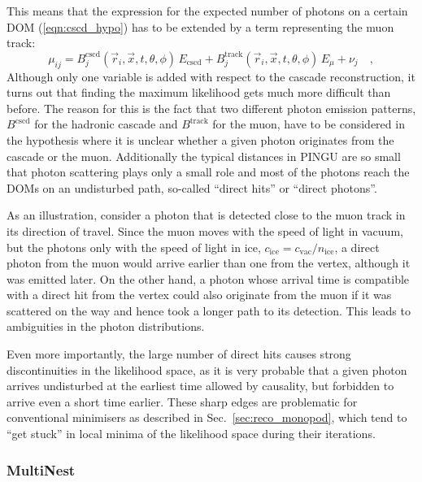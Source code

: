 This means that the expression for the expected number of photons on a certain
DOM (\ref{eqn:cscd_hypo}) has to be extended by a term representing the muon
track:
\begin{equation}
  \mu_{ij} = B^\mathrm{cscd}_j(\vec{r}_i, \vec{x}, t, \theta,\phi)
              \,E_\mathrm{cscd}
   + B^\mathrm{track}_j(\vec{r}_i, \vec{x}, t, \theta, \phi)\,E_\mu
   + \nu_j \quad, \label{eqn:hybrid_hypo}
\end{equation}
Although only one variable is added with respect to the cascade reconstruction,
it turns out that finding the maximum likelihood gets much more difficult than
before. The reason for this is the fact that two different photon emission
patterns, $B^\mathrm{cscd}$ for the hadronic cascade and $B^\mathrm{track}$ for
the muon, have to be considered in the hypothesis where it is unclear whether a
given photon originates from the cascade or the muon. Additionally the typical
distances in PINGU are so small that photon scattering plays only a small role
and most of the photons reach the DOMs on an undisturbed path, so-called
``direct hits'' or ``direct photons''.

As an illustration, consider a photon that is detected close to the muon track
in its direction of travel. Since the muon moves with the speed of light in
vacuum, but the photons only with the speed of light in ice, $c_\mathrm{ice} =
c_\mathrm{vac}/n_\mathrm{ice}$, a direct photon from the muon would arrive
earlier than one from the vertex, although it was emitted later. On the other
hand, a photon whose arrival time is compatible with a direct hit from the
vertex could also originate from the muon if it was scattered on the way and
hence took a longer path to its detection. This leads to ambiguities in the
photon distributions.

Even more importantly, the large number of direct hits causes strong
discontinuities in the likelihood space, as it is very probable that a given
photon arrives undisturbed at the earliest time allowed by causality, but
forbidden to arrive even a short time earlier. These sharp edges are
problematic for conventional minimisers as described in
Sec.~\ref{sec:reco_monopod}, which tend to ``get stuck'' in local minima of the
likelihood space during their iterations.

\subsubsection{MultiNest}

